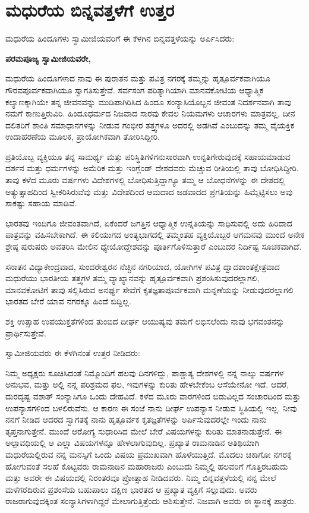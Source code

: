 
\chapter{ಮಧುರೆಯ ಬಿನ್ನವತ್ತಳೆಗೆ ಉತ್ತರ}

ಮಧುರೆಯ ಹಿಂದೂಗಳು ಸ್ವಾಮೀಜಿಯವರಿಗೆ ಈ ಕೆಳಗಿನ ಬಿನ್ನವತ್ತಳೆಯನ್ನು ಅರ್ಪಿಸಿ\-ದರು:

\textbf{ಪರಮಪೂಜ್ಯ ಸ್ವಾಮೀಜಿಯವರೇ,}

ಮಧುರೆಯ ಹಿಂದೂಗಳಾದ ನಾವು ಈ ಪುರಾತನ ಮತ್ತು ಪವಿತ್ರ ನಗರಕ್ಕೆ ತಮ್ಮನ್ನು ಹೃತ್ಪೂರ್ವಕವಾಗಿಯೂ ಗೌರವಪೂರ್ವಕವಾಗಿಯೂ ಸ್ವಾಗತಿಸುತ್ತೇವೆ. ಸರ್ವಸಂಗ ಪರಿತ್ಯಾಗಿಯಾಗಿ ಮಾನವಕೋಟಿಯ ಆಧ್ಯಾತ್ಮಿಕ ಕಲ್ಯಾಣಕ್ಕಾಗಿಯೇ ತನ್ನ ಜೀವನವನ್ನು ಮುಡಿಪಾಗಿರಿಸಿದ ಹಿಂದೂ ಸಂನ್ಯಾಸಿಯೊಬ್ಬನ ಜೀವಂತ ನಿದರ್ಶನವಾಗಿ ತಾವು ನಮಗೆ ಕಾಣುತ್ತಿರುವಿರಿ. ಹಿಂದೂಧರ್ಮದ ನಿಜವಾದ ಸಾರವು ಕೇವಲ ನಿಯಮಗಳು ಆಚಾರಗಳು ಮಾತ್ರವಲ್ಲ, ದೀನ ದಲಿತರಿಗೆ ಶಾಂತಿ ಸಮಾಧಾನಗಳನ್ನು ನೀಡುವ ಗಂಭೀರ ತತ್ತ್ವಗಳೂ ಅದರಲ್ಲಿ ಅಡಗಿವೆ ಎಂಬುದನ್ನು ತಮ್ಮ ವೈಯಕ್ತಿಕ ಉದಾಹರಣೆಯ ಮೂಲಕ, ಪ್ರಾಯೋಗಿಕವಾಗಿ ತೋರಿಸಿದ್ದೀರಿ.

ಪ್ರತಿಯೊಬ್ಬ ವ್ಯಕ್ತಿಯೂ ತನ್ನ ಸಾಮರ್ಥ್ಯ ಮತ್ತು ಪರಿಸ್ಥಿತಿಗಳಿಗನುಸಾರವಾಗಿ ಉನ್ನತಿಗೇರುವುದಕ್ಕೆ ಸಹಾಯಮಾಡುವ ದರ್ಶನ ಮತ್ತು ಧರ್ಮಗಳನ್ನು ಅಮೆರಿಕ ಮತ್ತು ಇಂಗ್ಲೆಂಡ್​ ದೇಶದವರು ಮೆಚ್ಚುವ ರೀತಿಯಲ್ಲಿ ತಾವು ಬೋಧಿಸಿದ್ದೀರಿ. ತಾವು ಕಳೆದ ಮೂರು ವರ್ಷಗಳು ವಿದೇಶಗಳಲ್ಲಿ ಬೋಧಿಸುತ್ತಿದ್ದಾಗ್ಯೂ ತಮ್ಮ ಆ ಬೋಧನೆಗಳನ್ನು ಈ ದೇಶದಲ್ಲಿ ಅತ್ಯುತ್ಸಾಹದಿಂದ ಸ್ವೀಕರಿಸಿರುವೆವು ಮತ್ತು ವಿದೇಶದಿಂದ ಆಮದಾದ ಜಡವಾದದ ಪ್ರಗತಿಯನ್ನು ಹಿಮ್ಮೆಟ್ಟಿಸಲು ಅವು ಸಾಕಷ್ಟು ಸಹಾಯ ಮಾಡಿವೆ.

ಭಾರತವು ಇಂದಿಗೂ ಜೀವಂತವಾಗಿದೆ, ಏಕೆಂದರೆ ಜಗತ್ತಿನ ಆಧ್ಯಾತ್ಮಿಕ ಉನ್ನತಿಯನ್ನು ಸಾಧಿಸುವಲ್ಲಿ ಅದು ಹಿರಿದಾದ ಪಾತ್ರವನ್ನು ವಹಿಸಬೇಕಾಗಿದೆ. ಈ ಕಲಿಯುಗದ ಅಂತ್ಯಭಾಗದಲ್ಲಿ ತಮ್ಮಂತಹ ವ್ಯಕ್ತಿಯೊಬ್ಬರ ಆಗಮನವು ಮುಂದೆ ಅನೇಕ ಶ್ರೇಷ್ಠ ಪುರುಷರು ಅವತರಿಸಿ ಮೇಲಿನ ಧ್ಯೇಯೋದ್ದೇಶವನ್ನು ಪೂರ್ತಿಗೊಳಿಸುತ್ತಾರೆ ಎಂಬುದರ ನಿರ್ದಿಷ್ಟ ಸೂಚಕವಾಗಿದೆ.

ಸನಾತನ ವಿದ್ಯಾಕೇಂದ್ರವಾದ, ಸುಂದರೇಶ್ವರನ ನೆಚ್ಚಿನ ನಗರಿಯಾದ, ಯೋಗಿಗಳ ಪವಿತ್ರ ದ್ವಾದಶಾಂತಕ್ಷೇತ್ರವಾದ ಮಧುರೆಯು ಭಾರತೀಯ ತತ್ತ್ವಗಳ ತಮ್ಮ ವ್ಯಾಖ್ಯಾನವನ್ನು ಹೃತ್ಪೂರ್ವಕವಾಗಿ ಪ್ರಶಂಸಿಸುವುದರಲ್ಲಾಗಲಿ, ಮಾನವಕೋಟಿಗೆ ತಾವು ಸಲ್ಲಿಸಿರುವ ಅನರ್ಘ್ಯ ಸೇವೆಗೆ ಕೃತಜ್ಞತಾಪೂರ್ವಕವಾಗಿ ಮನ್ನಣೆಯನ್ನು ನೀಡುವುದರಲ್ಲಾಗಲಿ ಭಾರತದ ಬೇರೆ ಯಾವ ನಗರಕ್ಕೂ ಹಿಂದೆ ಬಿದ್ದಿಲ್ಲ.

ಶಕ್ತಿ ಉತ್ಸಾಹ ಉಪಯುಕ್ತತೆಗಳಿಂದ ತುಂಬಿದ ದೀರ್ಘ ಆಯುಷ್ಯವು ತಮಗೆ ಲಭಿಸಲೆಂದು ನಾವು ಭಗವಂತನನ್ನು ಪ್ರಾರ್ಥಿಸುತ್ತೇವೆ.

ಸ್ವಾಮೀಜಿಯವರು ಈ ಕೆಳಗಿನಂತೆ ಉತ್ತರ ನೀಡಿದರು:

ನಿಮ್ಮ ಅಧ್ಯಕ್ಷರು ಸೂಚಿಸಿದಂತೆ ನಿಮ್ಮೊಂದಿಗೆ ಹಲವು ದಿನಗಳಿದ್ದು, ಪಾಶ್ಚಾತ್ಯ ದೇಶಗಳಲ್ಲಿ ನನ್ನ ನಾಲ್ಕು ವರ್ಷಗಳ ಅನುಭವ, ಮತ್ತು ಅಲ್ಲಿ ನನ್ನ ಪರಿಶ್ರಮದ ಫಲ, ಇವುಗಳನ್ನು ಕುರಿತು ಹೇಳಬೇಕೆಂಬ ಆಸೆಯೇನೋ ಇದೆ. ಆದರೆ, ದುರದೃಷ್ಟ ವಶಾತ್​ ಸಂನ್ಯಾಸಿಗೂ ಒಂದು ದೇಹವಿದೆ. ಕಳೆದ ಮೂರು ವಾರಗಳಿಂದ ಬಿಡುವಿಲ್ಲದ ಸಂಚಾರದಿಂದ ಮತ್ತು ಉಪನ್ಯಾಸಗಳಿಂದ ಬಳಲಿರುವೆನು. ಆ ಕಾರಣ ಈ ಸಂಜೆ ನಾನು ದೀರ್ಘ ಉಪನ್ಯಾಸ ನೀಡುವ ಸ್ಥಿತಿಯಲ್ಲಿ ಇಲ್ಲ. ನೀವು ನನಗೆ ನೀಡಿದ ಆದರದ ಸ್ವಾಗತಕ್ಕೆ ನಾನು ಹೃತ್ಪೂರ್ವಕ ಕೃತಜ್ಞತೆಗಳನ್ನು ಅರ್ಪಿಸುವುದರಲ್ಲೇ ಇಂದು ನಾನು ತೃಪ್ತನಾಗುತ್ತೇನೆ. ಮುಂದೆ ಆರೋಗ್ಯ ಸುಧಾರಿಸಿದ ಮೇಲೆ ಬೇರೆ ವಿಷಯಗಳನ್ನು ಕುರಿತು ಮಾತನಾಡುತ್ತೇನೆ. ಈ ಅಲ್ಪಾವಧಿಯಲ್ಲಿ ಆ ಎಲ್ಲಾ ವಿಷಯಗಳನ್ನೂ ಹೇಳಲಾಗುವುದಿಲ್ಲ. ಪ್ರಖ್ಯಾತ ರಾಮನಾಡಿನ ಅತಿಥಿಯಾಗಿ ಮಧುರೆಯಲ್ಲಿರುವ ನನ್ನ ಮನಸ್ಸಿಗೆ ಒಂದು ವಿಷಯ ಪ್ರಮುಖವಾಗಿ ಹೊಳೆಯುತ್ತಿದೆ. ಮೊದಲು ಚಿಕಾಗೋ ನಗರಕ್ಕೆ ಹೋಗುವಂತೆ ಸಲಹೆ ಕೊಟ್ಟವರು ರಾಮನಾಡಿನ ಮಹಾರಾಜರು ಎಂಬುದು ನಿಮ್ಮಲ್ಲಿ ಹಲವರಿಗೆ ಗೊತ್ತಿರಬಹುದು ಮತ್ತು ಅವರೇ ಈ ವಿಷಯದಲ್ಲಿ ನಿರಂತರವೂ ಪ್ರೋತ್ಸಾಹ ನೀಡಿದವರು. ನಿಮ್ಮ ಬಿನ್ನವತ್ತಳೆಯಲ್ಲಿ ನನ್ನ ಮೇಲೆ ಮಳೆಗರೆದಿರುವ ಪ್ರಶಂಸೆಯ ಬಹುಪಾಲು ದಕ್ಷಿಣ ಭಾರತದ ಆ ಪ್ರಖ್ಯಾತ ವ್ಯಕ್ತಿಗೆ ಸಲ್ಲುವುದು. ಅವರು ರಾಜರಾಗುವುದಕ್ಕಿಂತ ಸಂನ್ಯಾಸಿಗಳಾಗಿದ್ದರೆ ಮೇಲಾಗುತ್ತಿತ್ತೆಂದು ಆಶಿಸುತ್ತೇನೆ. ನಿಜವಾಗಿ ಅವರು ಈ ಸ್ಥಾನಕ್ಕೆ ಪಾತ್ರರು.

